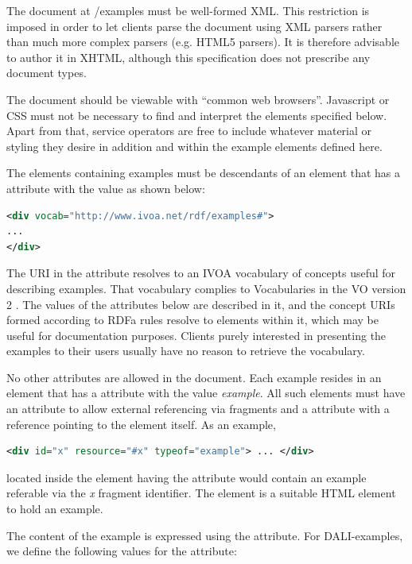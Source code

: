 \documentclass[11pt,letter]{ivoa}
\begin{document}
The document at /examples must be well-formed XML. This restriction is imposed
in order to let clients parse the document using XML parsers rather than
much more complex parsers (e.g. HTML5 parsers). It is therefore advisable to
author it in XHTML, although this specification does not prescribe any document
types.

The document should be viewable with ``common web browsers''. Javascript or CSS
must not be necessary to find and interpret the elements specified below.  Apart
from that, service operators are free to include whatever material or styling
they desire in addition and within the example elements defined here.

The elements containing examples must be descendants of an element that has a
 attribute with the value as shown below:

\begin{lstlisting}[language=XML]
<div vocab="http://www.ivoa.net/rdf/examples#">
...
</div>
\end{lstlisting}

The URI in the  attribute resolves to an IVOA vocabulary of
concepts useful for describing examples.  That vocabulary complies to
Vocabularies in the VO version 2 \citep{2021ivoa.spec.0525D}.   The
values of the  attributes below are described in it, and
the concept URIs formed according to RDFa rules resolve to elements
within it, which may be useful for documentation purposes.  Clients
purely interested in presenting the examples to their users usually have
no reason to retrieve the vocabulary.

No other  attributes are allowed in the document. Each example resides in
an element that has a  attribute with the value
\emph{example}. All such elements
must have an  attribute to allow external referencing via fragments and a
 attribute with a reference pointing to the element itself. As an
example,

\begin{lstlisting}[language=XML]
<div id="x" resource="#x" typeof="example"> ... </div>
\end{lstlisting}

\noindent located inside the element having the  attribute would
contain an example referable via the \emph{x} fragment identifier. The
 element is
a suitable HTML element to hold an example.

The content of the example is expressed using the  attribute. For
DALI-examples, we define the following values for the  attribute:
\end{document}
